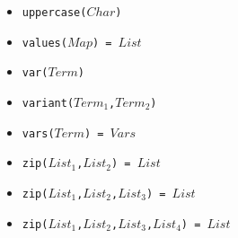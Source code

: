 \documentclass[10pt]{article}
\begin{document}
\begin{multicols}{2}
\begin{scriptsize}
\begin{itemize}
    \item \texttt{uppercase($Char$)} 
    \item \texttt{values($Map$) = $List$} 
    \item \texttt{var($Term$)} 
    \item \texttt{variant($Term_1$,$Term_2$)}
    \item \texttt{vars($Term$) = $Vars$}
    \item \texttt{zip($List_1$,$List_2$) = $List$} 
    \item \texttt{zip($List_1$,$List_2$,$List_3$) = $List$} 
    \item \texttt{zip($List_1$,$List_2$,$List_3$,$List_4$) = $List$} 
\end{itemize}
\end{scriptsize}

%

\end{multicols}
\end{document}
